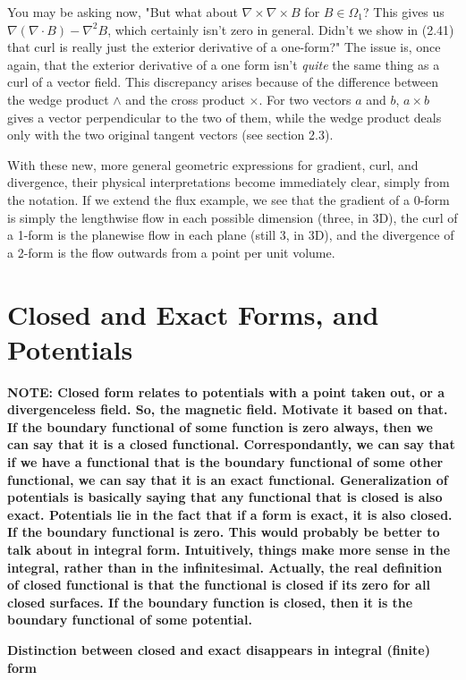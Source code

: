 \documentclass{book}
\begin{document}
You may be asking now, "But what about $\nabla \times \nabla \times B$ for $B \in \Omega_1$? This gives us $\nabla (\nabla \cdot B) - \nabla^2 B$, which certainly isn't zero in general. Didn't we show in (2.41) that curl is really just the exterior derivative of a one-form?" The issue is, once again, that the exterior derivative of a one form isn't \emph{quite} the same thing as a curl of a vector field. This discrepancy arises because of the difference between the wedge product $\wedge$ and the cross product $\times$. For two vectors $a$ and $b$, $a \times b$ gives a vector perpendicular to the two of them, while the wedge product deals only with the two original tangent vectors (see section 2.3). 

With these new, more general geometric expressions for gradient, curl, and divergence, their physical interpretations become immediately clear, simply from the notation. If we extend the flux example, we see that the gradient of a 0-form is simply the lengthwise flow in each possible dimension (three, in 3D), the curl of a 1-form is the planewise flow in each plane (still 3, in 3D), and the divergence of a 2-form is the flow outwards from a point per unit volume. 



\section{Closed and Exact Forms, and Potentials}

\textbf{NOTE: Closed form relates to potentials with a point taken out, or a divergenceless field. So, the magnetic field. Motivate it based on that. If the boundary functional of some function is zero always, then we can say that it is a closed functional. Correspondantly, we can say that if we have a functional that is the boundary functional of some other functional, we can say that it is an exact functional. Generalization of potentials is basically saying that any functional that is closed is also exact. Potentials lie in the fact that if a form is exact, it is also closed. If the boundary functional is zero. This would probably be better to talk about in integral form. Intuitively, things make more sense in the integral, rather than in the infinitesimal. Actually, the real definition of closed functional is that the functional is closed if its zero for all closed surfaces. If the boundary function is closed, then it is the boundary functional of some potential.}

\textbf{Distinction between closed and exact disappears in integral (finite) form}
\end{document}
